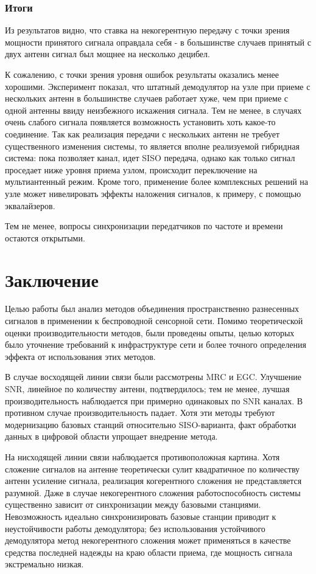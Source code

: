 \documentclass[a4paper,12pt,oneside, abstract=true]{scrartcl}
\begin{document}
\subsubsection{Итоги}

Из результатов видно, что ставка на некогерентную передачу с точки зрения мощности принятого сигнала оправдала себя - в большинстве случаев принятый с двух антенн сигнал был мощнее на несколько децибел.

К сожалению, с точки зрения уровня ошибок результаты оказались менее хорошими.
Эксперимент показал, что штатный демодулятор на узле при приеме с нескольких антенн в большинстве случаев работает хуже, чем при приеме с одной антенны ввиду неизбежного искажения сигнала. 
Тем не менее, в случаях очень слабого сигнала появляется возможность установить хоть какое-то соединение. 
Так как реализация передачи с нескольких антенн не требует существенного изменения системы, то является вполне реализуемой гибридная система: пока позволяет канал, идет SISO передача, однако как только сигнал проседает ниже уровня приема узлом, происходит переключение на мультиантенный режим.
Кроме того, применение более комплексных решений на узле может нивелировать эффекты наложения сигналов, к примеру, с помощью эквалайзеров\cite{B2}.

Тем не менее, вопросы синхронизации передатчиков по частоте и времени остаются открытыми.

\clearpage

\section{Заключение}

Целью работы был анализ методов объединения пространственно разнесенных сигналов в применении к беспроводной сенсорной сети. 
Помимо теоретической оценки производительности методов, были проведены опыты, целью которых было уточнение требований к инфраструктуре сети и более точного определения эффекта от использования этих методов.

В случае восходящей линии связи были рассмотрены MRC и EGC.
Улучшение SNR, линейное по количеству антенн, подтвердилось; тем не менее, лучшая производительность наблюдается при примерно одинаковых по SNR каналах.
В противном случае производительность падает.
Хотя эти методы требуют модернизацию базовых станций относительно SISO-варианта, факт обработки данных в цифровой области упрощает внедрение метода.

На нисходящей линии связи наблюдается противоположная картина. 
Хотя сложение сигналов на антенне теоретически сулит квадратичное по количеству антенн усиление сигнала, реализация когерентного сложения не представляется разумной.
Даже в случае некогерентного сложения работоспособность системы существенно зависит от синхронизации между базовыми станциями.
Невозможность идеально синхронизировать базовые станции приводит к неустойчивости работы демодулятора; без использования устойчивого демодулятора метод некогерентного сложения может применяться в качестве средства последней надежды на краю области приема, где мощность сигнала экстремально низкая.
\end{document}
